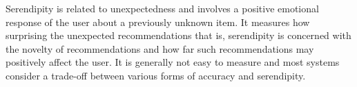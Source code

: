 Serendipity is related to unexpectedness and involves a positive emotional response of the user about a previously unknown item. It measures how surprising the unexpected recommendations that is, serendipity is concerned with the novelty of recommendations and how far such recommendations may positively affect the user. It is generally not easy to measure and most systems consider a trade-off between various forms of accuracy and serendipity. 
% 

